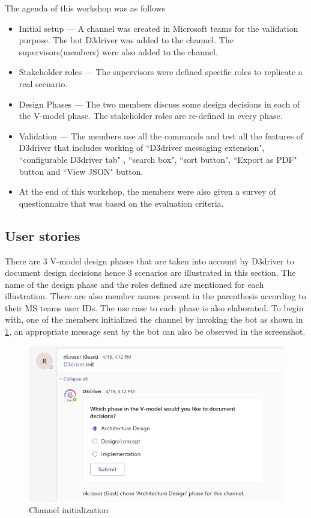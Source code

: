 The agenda of this workshop was as follows
\begin{itemize}
\item Initial setup --- A channel was created in Microsoft teams for the validation purpose. The bot D3driver was added to the channel. The supervisors(members) were also added to the channel. 
\item Stakeholder roles --- The supervisors were defined specific roles to replicate a real scenario. 
\item Design Phases --- The two members discuss some design decisions in each of the V-model phase. The stakeholder roles are re-defined in every phase.
\item Validation --- The members use all the commands and test all the features of D3driver that includes working of ``D3driver messaging extension", ``configurable D3driver tab" , ``search box", ``sort button", ``Export as PDF" button and ``View JSON" button. 
\item At the end of this workshop, the members were also given a survey of questionnaire that was based on the evaluation criteria. 
\end{itemize}

\subsection{User stories}
There are 3  V-model design phases that are taken into account by D3driver to document design decisions hence 3 scenarios are illustrated in this section. The name of the design phase and the roles defined are mentioned for each illustration. There are also member names present in the parenthesis according to their MS teams user IDs. The use case to each phase is also elaborated. To begin with, one of the members initialized the channel by invoking the bot as shown in \ref{fig:initadp}, an appropriate message sent by the bot can also be observed in the screenshot. 


\begin{figure}
\centering
\includegraphics[width=0.7\linewidth]{figures/initadp}
\caption{Channel initialization}
\label{fig:initadp}
\end{figure}


